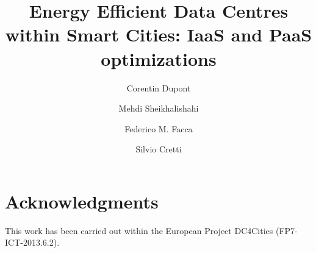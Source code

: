 \documentclass[lnicst]{svmultln}
\begin{document}
\mainmatter 

\title{Energy Efficient Data Centres within Smart Cities: IaaS and PaaS optimizations}


\author{Corentin Dupont\and Mehdi Sheikhalishahi\and Federico M. Facca \and Silvio Cretti }


\maketitle        

\begin{abstract}        


\end{abstract}


%





\section*{Acknowledgments}
This work has been carried out within the European Project DC4Cities (FP7-ICT-2013.6.2).



\end{document}
